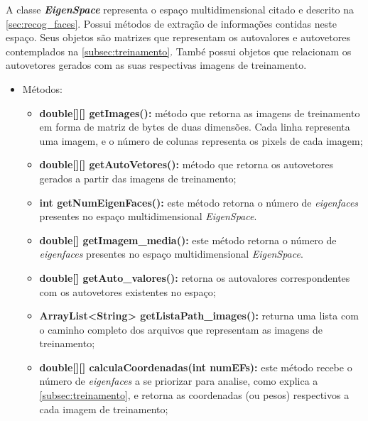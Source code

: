 
A classe \textit{\textbf{EigenSpace}} representa o espaço multidimensional citado e descrito na  \autoref{sec:recog_faces}. Possui métodos de extração de informações contidas neste espaço. Seus objetos são matrizes que representam os autovalores e autovetores contemplados na \autoref{subsec:treinamento}. També possui objetos que relacionam os autovetores gerados com as suas respectivas imagens de treinamento.


\begin{itemize}	
	\item Métodos:
	\begin{itemize}
		\item \textbf{double[][] getImages():} método que retorna as imagens de treinamento em forma de matriz de bytes de duas dimensões. Cada linha representa uma imagem, e o número de colunas representa os pixels de cada imagem;
		
		\item \textbf{double[][] getAutoVetores():} método que retorna os autovetores gerados a partir das imagens de treinamento;
		
		\item \textbf{int getNumEigenFaces():} este método retorna o número de \textit{eigenfaces} presentes no espaço multidimensional \textit{EigenSpace}.
		
		\item \textbf{double[] getImagem\_media():} este método retorna o número de \textit{eigenfaces} presentes no espaço multidimensional \textit{EigenSpace}.
		
		\item \textbf{double[] getAuto\_valores():} retorna os autovalores correspondentes com os autovetores existentes no espaço;
		
		
		\item \textbf{ArrayList<String> getListaPath\_images():} returna uma lista com o caminho completo dos arquivos que representam as imagens de treinamento;
		
		\item \textbf{double[][] calculaCoordenadas(int numEFs):} este método recebe o número de \textit{eigenfaces} a se priorizar para analise, como explica a \autoref{subsec:treinamento}, e retorna as coordenadas (ou pesos) respectivos a cada imagem de treinamento;		
	
	\end{itemize}
\end{itemize}

